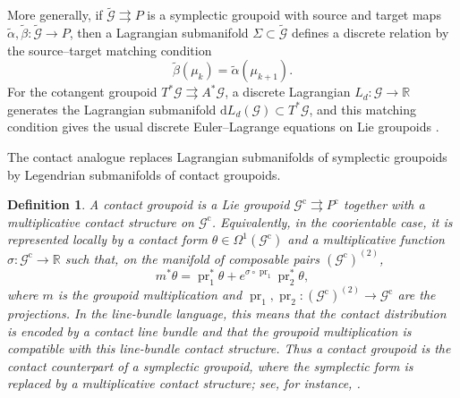 \documentclass[11pt]{article}
\newtheorem{definition}[theorem]{Definition}
\newcommand{\R}{\mathbb{R}}
\newcommand{\dd}{\mathrm{d}}
\begin{document}
More generally, if
\(\widetilde{\mathcal G}\rightrightarrows P\) is a symplectic groupoid with
source and target maps
$\widetilde\alpha,\widetilde\beta:\widetilde{\mathcal G}\longrightarrow P$, then a Lagrangian submanifold
\(\Sigma\subset\widetilde{\mathcal G}\) defines a discrete relation by the
source--target matching condition
\[
\widetilde\beta(\mu_k)=\widetilde\alpha(\mu_{k+1}).
\]
For the cotangent groupoid
\(T^*\mathcal G\rightrightarrows A^*\mathcal G\), a discrete Lagrangian
\(L_d:\mathcal G\to\R\) generates the Lagrangian submanifold $\dd L_d(\mathcal G)\subset T^*\mathcal G$,
and this matching condition gives the usual discrete Euler--Lagrange equations
on Lie groupoids \cite{MarreroMartinDeDiegoStern2015}.

The contact analogue replaces Lagrangian submanifolds of symplectic groupoids
by Legendrian submanifolds of contact groupoids.

\begin{definition}
A \emph{contact groupoid} is a Lie groupoid
$\mathcal G^{\mathrm c}\rightrightarrows P^{\mathrm c}$
together with a multiplicative contact structure on \(\mathcal G^{\mathrm c}\).
Equivalently, in the coorientable case, it is represented locally by a contact
form \(\theta\in\Omega^1(\mathcal G^{\mathrm c})\) and a multiplicative function
\(\sigma:\mathcal G^{\mathrm c}\to\mathbb R\) such that, on the manifold of
composable pairs \((\mathcal G^{\mathrm c})^{(2)}\),
\begin{equation}\label{contgro}
m^*\theta
=
\operatorname{pr}_1^*\theta
+
e^{\sigma\circ\operatorname{pr}_1}\operatorname{pr}_2^*\theta,\end{equation} where \(m\) is the groupoid multiplication and
\(\operatorname{pr}_1,\operatorname{pr}_2:(\mathcal G^{\mathrm c})^{(2)}
\to\mathcal G^{\mathrm c}\) are the projections. In the line-bundle language,
this means that the contact distribution is encoded by a contact line bundle
and that the groupoid multiplication is compatible with this line-bundle contact
structure. Thus a contact groupoid is the contact counterpart of a symplectic
groupoid, where the symplectic form is replaced by a multiplicative contact
structure; see, for instance,
\cite{CrainicZhu2007,IglesiasMarrero2003,BGG2017}.
\end{definition}
\end{document}
